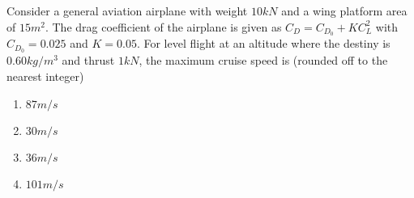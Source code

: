 \iffalse
\chapter{2023}
\author{AI24BTECH11020}
\section{ae}
\fi

	\item Consider a general aviation airplane with weight $10 kN$ and a wing platform area of $15 m^2$. The drag coefficient of the airplane is given as $C_D=C_{D_0}+KC_L^2$ with $C_{D_0}=0.025$ and $K=0.05$. For level flight at an altitude where the destiny is $0.60 kg/m^3$ and thrust $1 kN$, the maximum cruise speed is (rounded off to the nearest integer)
		\begin{enumerate}
			\item $87 m/s$
			\item $30 m/s$
			\item $36 m/s$
			\item $101 m/s$
		\end{enumerate}


